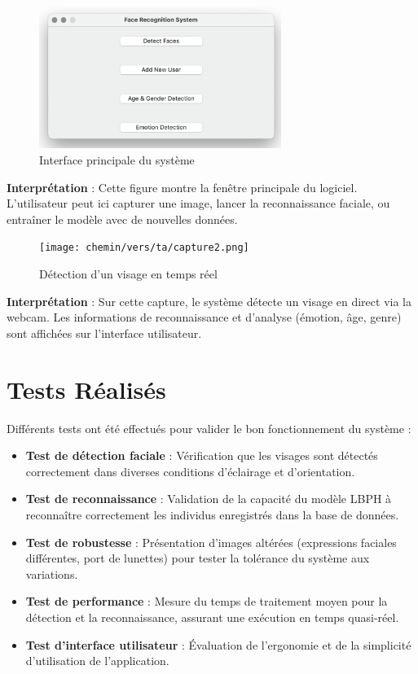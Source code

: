 \documentclass[a4paper,12pt]{report} %
\begin{document}
\begin{figure}[H]
    \centering
    \includegraphics[width=0.7\textwidth]{capture1.png}
    \caption{Interface principale du système}
\end{figure}

\textbf{Interprétation} :  
Cette figure montre la fenêtre principale du logiciel. L'utilisateur peut ici capturer une image, lancer la reconnaissance faciale, ou entraîner le modèle avec de nouvelles données.

\vspace{0.5cm}

\begin{figure}[H]
    \centering
    \texttt{[image: chemin/vers/ta/capture2.png]}
    \caption{Détection d'un visage en temps réel}
\end{figure}

\textbf{Interprétation} :  
Sur cette capture, le système détecte un visage en direct via la webcam. Les informations de reconnaissance et d'analyse (émotion, âge, genre) sont affichées sur l'interface utilisateur.

\section{Tests Réalisés}

Différents tests ont été effectués pour valider le bon fonctionnement du système :

\begin{itemize}
    \item \textbf{Test de détection faciale} : Vérification que les visages sont détectés correctement dans diverses conditions d'éclairage et d'orientation.
    \item \textbf{Test de reconnaissance} : Validation de la capacité du modèle LBPH à reconnaître correctement les individus enregistrés dans la base de données.
    \item \textbf{Test de robustesse} : Présentation d'images altérées (expressions faciales différentes, port de lunettes) pour tester la tolérance du système aux variations.
    \item \textbf{Test de performance} : Mesure du temps de traitement moyen pour la détection et la reconnaissance, assurant une exécution en temps quasi-réel.
    \item \textbf{Test d'interface utilisateur} : Évaluation de l'ergonomie et de la simplicité d'utilisation de l'application.
\end{itemize}
\end{document}
